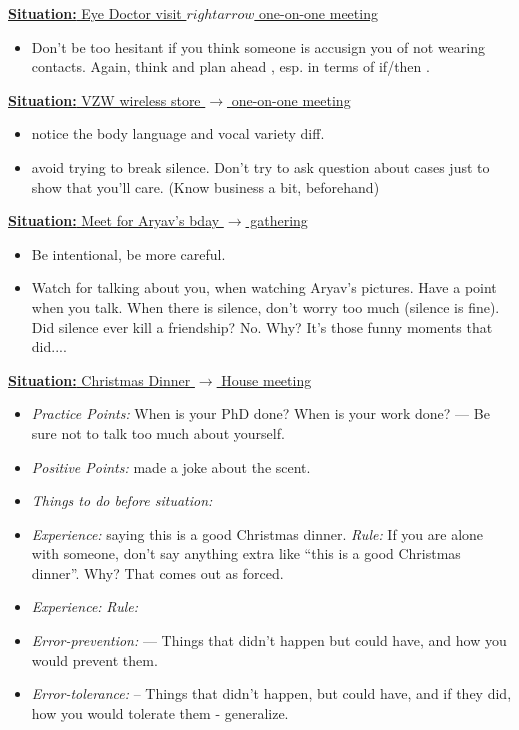 \documentclass[11pt]{article}
\newcommand{\newSituation}[1]{\underline{\textbf{Situation:} #1} }
\begin{document}
\newSituation{Eye Doctor visit $rightarrow$ one-on-one meeting }
\begin{itemize}
\item Don't be too hesitant if you think someone is accusign you of not wearing contacts. Again, think and plan ahead , esp. in terms of  if/then .
\end{itemize}

\newSituation{VZW wireless store $\rightarrow$ one-on-one meeting } 
\begin{itemize}
\item notice the body language and vocal variety diff. 
\item avoid trying to break silence. Don't try to ask question about cases just to show that you'll care.  (Know business a bit, beforehand)
\end{itemize}

 \newSituation{ Meet for Aryav's bday $\rightarrow$ gathering}
 \begin{itemize} 
  \item  Be intentional, be more careful. 
  \item  Watch for talking about you, when watching Aryav's pictures. 
Have a point when you talk. When there is silence, don't worry too much (silence is fine). Did silence ever kill a friendship? No. Why? It's those funny moments that did.... 
\end{itemize} 

\newSituation{Christmas Dinner $\rightarrow$ House meeting } 
\begin{itemize} 
\item \textit{Practice Points:} When is your PhD done? When is your work done?  --- Be sure not to talk too much about yourself.  
\item \textit{Positive Points:} made a joke about the scent.
\item \textit{Things to do before situation:} 
\item \textit{Experience:} saying this is a good Christmas dinner.  \textit{Rule:} If you are alone with someone, don't say anything extra like ``this is a good Christmas dinner''. Why? That comes out as forced. 
\item \textit{Experience:}  \textit{Rule:} 
\item \textit{Error-prevention:}  ---  Things that didn't happen but could have, and how you would prevent them. 
\item \textit{Error-tolerance:} -- Things that didn't happen, but could have, and if they did, how you would tolerate them - generalize. 
\end{itemize}
\end{document}
